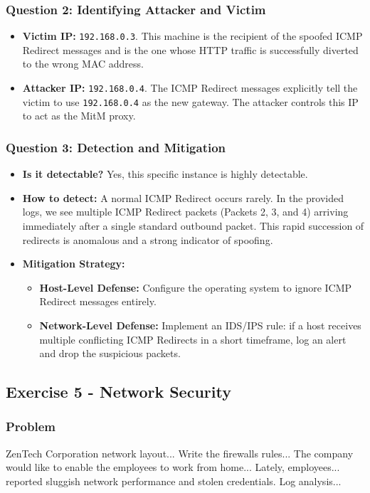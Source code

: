 \documentclass{article}
\begin{document}
\subsubsection*{Question 2: Identifying Attacker and Victim}
\begin{itemize}
    \item \textbf{Victim IP:} \texttt{192.168.0.3}. This machine is the recipient of the spoofed ICMP Redirect messages and is the one whose HTTP traffic is successfully diverted to the wrong MAC address.
    \item \textbf{Attacker IP:} \texttt{192.168.0.4}. The ICMP Redirect messages explicitly tell the victim to use \texttt{192.168.0.4} as the new gateway. The attacker controls this IP to act as the MitM proxy.
\end{itemize}

\subsubsection*{Question 3: Detection and Mitigation}
\begin{itemize}
    \item \textbf{Is it detectable?} Yes, this specific instance is highly detectable.
    \item \textbf{How to detect:} A normal ICMP Redirect occurs rarely. In the provided logs, we see multiple ICMP Redirect packets (Packets 2, 3, and 4) arriving immediately after a single standard outbound packet. This rapid succession of redirects is anomalous and a strong indicator of spoofing.
    \item \textbf{Mitigation Strategy:}
    \begin{itemize}
        \item \textbf{Host-Level Defense:} Configure the operating system to ignore ICMP Redirect messages entirely.
        \item \textbf{Network-Level Defense:} Implement an IDS/IPS rule: if a host receives multiple conflicting ICMP Redirects in a short timeframe, log an alert and drop the suspicious packets.
    \end{itemize}
\end{itemize}

\subsection{Exercise 5 - Network Security}
\subsubsection*{Problem}
ZenTech Corporation network layout... Write the firewalls rules... The company would like to enable the employees to work from home... Lately, employees... reported sluggish network performance and stolen credentials. Log analysis...
\end{document}
